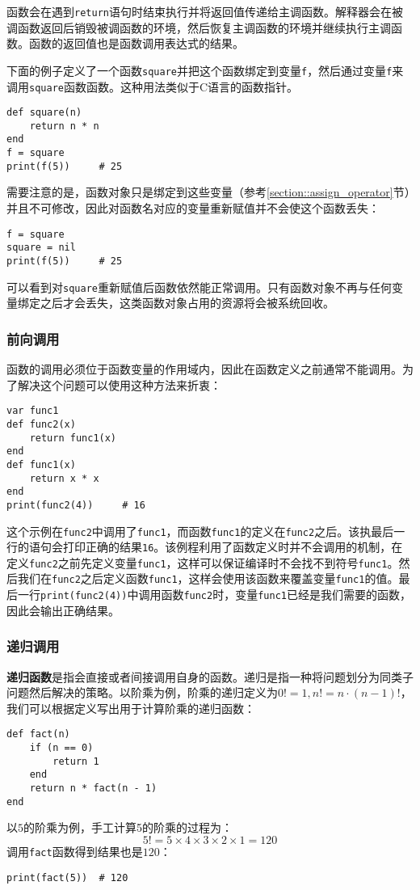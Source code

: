 函数会在遇到\texttt{return}语句时结束执行并将返回值传递给主调函数。解释器会在被调函数返回后销毁被调函数的环境，然后恢复主调函数的环境并继续执行主调函数。函数的返回值也是函数调用表达式的结果。

下面的例子定义了一个函数\texttt{square}并把这个函数绑定到变量\texttt{f}，然后通过变量\texttt{f}来调用\texttt{square}函数函数。这种用法类似于C语言的函数指针。
\begin{lstlisting}[language=berry, numbers=none]
def square(n)
    return n * n
end
f = square
print(f(5))     # 25
\end{lstlisting}
需要注意的是，函数对象只是绑定到这些变量（参考\ref{section::assign_operator}节）并且不可修改，因此对函数名对应的变量重新赋值并不会使这个函数丢失：
\begin{lstlisting}[language=berry, numbers=none]
f = square
square = nil
print(f(5))     # 25
\end{lstlisting}
可以看到对\texttt{square}重新赋值后函数依然能正常调用。只有函数对象不再与任何变量绑定之后才会丢失，这类函数对象占用的资源将会被系统回收。

\subsubsection{前向调用}

函数的调用必须位于函数变量的作用域内，因此在函数定义之前通常不能调用。为了解决这个问题可以使用这种方法来折衷：
\begin{lstlisting}[language=berry, numbers=none]
var func1
def func2(x)
    return func1(x)
end
def func1(x)
    return x * x
end
print(func2(4))     # 16
\end{lstlisting}
这个示例在\texttt{func2}中调用了\texttt{func1}，而函数\texttt{func1}的定义在\texttt{func2}之后。该执最后一行的语句会打印正确的结果\texttt{16}。该例程利用了函数定义时并不会调用的机制，在定义\texttt{func2}之前先定义变量\texttt{func1}，这样可以保证编译时不会找不到符号\texttt{func1}。然后我们在\texttt{func2}之后定义函数\texttt{func1}，这样会使用该函数来覆盖变量\texttt{func1}的值。最后一行\texttt{print(func2(4))}中调用函数\texttt{func2}时，变量\texttt{func1}已经是我们需要的函数，因此会输出正确结果。

\subsubsection{递归调用}

\textbf{递归函数}是指会直接或者间接调用自身的函数。递归是指一种将问题划分为同类子问题然后解决的策略。以阶乘为例，阶乘的递归定义为$0!=1, n!=n\cdot(n-1)!$，我们可以根据定义写出用于计算阶乘的递归函数：
\begin{lstlisting}[language=berry]
def fact(n)
    if (n == 0)
        return 1
    end
    return n * fact(n - 1)
end
\end{lstlisting}
以$5$的阶乘为例，手工计算5的阶乘的过程为：
\begin{equation*}
5! = 5 \times 4 \times 3 \times 2 \times 1 = 120
\end{equation*}
调用\texttt{fact}函数得到结果也是$120$：
\begin{lstlisting}[language=berry, numbers=none]
print(fact(5))  # 120
\end{lstlisting}

